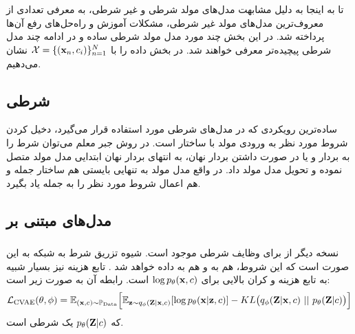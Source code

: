 \section{\condtg}
تا به اینجا به دلیل مشابهت مدل‌های مولد شرطی و غیر شرطی، به معرفی تعدادی از معروف‌ترین مدل‌های مولد غیر شرطی، مشکلات آموزش و راه‌حل‌های رفع آن‌ها پرداخته شد. در این بخش چند مورد مدل مولد شرطی ساده و در ادامه چند مدل شرطی پیچیده‌تر معرفی خواهند شد. در بخش داده را با ${\mathcal{X}} = \{({\bf x}_n, c_i)\}_{n=1}^N$ نشان می‌دهیم.
\subsection{\rnn{}
     شرطی}
ساده‌ترین رویکردی که در مدل‌های شرطی مورد استفاده قرار می‌گیرد، دخیل کردن شروط مورد نظر به ورودی مولد با ساختار
است. در روش جبر معلم می‌توان شرط را به بردار
و  یا در صورت داشتن بردار نهان، به انتهای بردار نهان ابتدایی مدل مولد متصل نموده و تحویل مدل مولد داد. در واقع مدل مولد به تنهایی بایستی هم ساختار جمله و هم اعمال شروط مورد نظر را به جمله یاد بگیرد.
\subsection{مدل‌های مبتنی بر \vae{}}
\subsubsection{\cvae{}}
نسخه دیگر از \vae{} برای وظایف شرطی موجود است. شیوه تزریق شرط به شبکه به این صورت است که این شروط، هم به \encoder{} و هم به \decoder{} داده خواهد شد \cite{cvae, cvae_semi}. تابع هزینه نیز بسیار شبیه به تابع هزینه \vae{} و کران بالایی برای $\log p_\theta({\bf x},c)$ است. رابطه آن به صورت زیر است:
\begin{align}
	{\mathcal{L}}_\text{CVAE}(\theta, \phi) = \mathbb E_{({\bf x},c) \sim \mathbb P_\text{Data}} \Big[
		\mathbb E_{{\bf z} \sim q_\phi({\bf Z}|{\bf x}, c)} [\log p_\theta({\bf x}|{\bf z}, c)]
		- KL\big(q_\phi({\bf Z}|{\bf x},c) ~ || ~ p_\theta({\bf Z}|c) \big)
		\Big]
\end{align}
که $p_\theta({\bf Z}|c)$  یک \priordist{} شرطی است.

